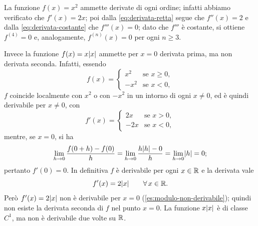 \begin{esempio}\label{es:x-modulo-x}
La funzione $f(x)=x^{2}$ ammette derivate di ogni ordine; infatti abbiamo verificato
che $f'(x)=2x$; poi dalla \eqref{eq:derivata-retta} segue che $f''(x)=2$ e dalla
\eqref{eq:derivata-costante} che $f'''(x)=0$; dato che $f'''$ è costante, si ottiene
$f^{(4)}=0$ e, analogamente, $f^{(n)}(x)=0$ per ogni $n\ge3$.

Invece la funzione $f(x)=x\lvert x\rvert$ ammette per $x=0$ derivata prima, ma non derivata
seconda. Infatti, essendo
\begin{equation}\label{eq:x-modulo-x}
  f(x)=
  \begin{cases}
    x^{2} & \text{se } x\ge0,\\
    -x^{2} & \text{se } x<0,
  \end{cases}
\end{equation}
$f$ coincide localmente con $x^{2}$ o con $-x^{2}$ in un intorno di ogni $x\neq0$, ed è
quindi derivabile per $x\neq0$, con
\begin{equation}\label{eq:x-modulo-x-derivata}
  f'(x)=
  \begin{cases}
    2x & \text{se } x>0,\\
    -2x & \text{se } x<0,
  \end{cases}
\end{equation}
mentre, se $x=0$, si ha
\begin{equation}\label{eq:x-modulo-x-zero}
  \lim_{h\to0}\frac{f(0+h)-f(0)}{h}=\lim_{h\to0}\frac{h\lvert h\rvert-0}{h}=\lim_{h\to0}\lvert h\rvert=0;
\end{equation}
pertanto $f'(0)=0$. In definitiva $f$ è derivabile per ogni $x\in\mathbb{R}$ e la derivata vale
\begin{equation}\label{eq:x-modulo-x-finale}
  f'(x)=2\lvert x\rvert \qquad\forall\, x\in\mathbb{R} .
\end{equation}
Però $f'(x)=2\lvert x\rvert$ non è derivabile per $x=0$ (\cref{es:modulo-non-derivabile});
quindi non esiste la derivata seconda di $f$ nel punto $x=0$. La funzione $x\lvert x\rvert$ è di
classe $C^{1}$, ma non è derivabile due volte su $\mathbb{R}$.
\end{esempio}

